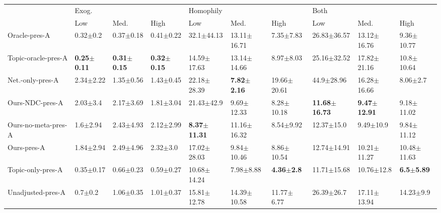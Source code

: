 \begin{tabular}{llllllllll}
\toprule
{} & \multicolumn{3}{l}{Exog.} & \multicolumn{3}{l}{Homophily} & \multicolumn{3}{l}{Both} \\
{} &                     Low &                    Med. &                    High &                      Low &                    Med. &                   High &                       Low &                     Med. &                   High \\
\midrule
Oracle-pres-A       &            0.32$\pm$0.2 &           0.37$\pm$0.18 &           0.41$\pm$0.22 &           32.1$\pm$44.13 &         13.11$\pm$16.71 &          7.35$\pm$7.83 &           26.83$\pm$36.57 &          13.12$\pm$16.76 &         9.36$\pm$10.77 \\
Topic-oracle-pres-A &  \textbf{0.25$\pm$0.11} &  \textbf{0.31$\pm$0.15} &  \textbf{0.32$\pm$0.15} &          14.59$\pm$17.63 &         13.14$\pm$14.66 &          8.97$\pm$8.03 &           25.16$\pm$32.52 &          17.82$\pm$21.16 &         10.8$\pm$10.64 \\
Net.-only-pres-A    &           2.34$\pm$2.22 &           1.35$\pm$0.56 &           1.43$\pm$0.45 &          22.18$\pm$28.39 &  \textbf{7.82$\pm$2.16} &        19.66$\pm$20.61 &            44.9$\pm$28.96 &          16.28$\pm$16.66 &           8.06$\pm$2.7 \\
Ours-NDC-pres-A     &            2.03$\pm$3.4 &           2.17$\pm$3.69 &           1.81$\pm$3.04 &           21.43$\pm$42.9 &          9.69$\pm$12.33 &         8.28$\pm$10.18 &  \textbf{11.68$\pm$16.73} &  \textbf{9.47$\pm$12.91} &         9.18$\pm$11.02 \\
Ours-no-meta-pres-A &            1.6$\pm$2.94 &           2.43$\pm$4.93 &           2.12$\pm$2.99 &  \textbf{8.37$\pm$11.31} &         11.16$\pm$16.32 &          8.54$\pm$9.92 &            12.37$\pm$15.0 &            9.49$\pm$10.9 &         9.84$\pm$11.12 \\
Ours-pres-A         &           1.84$\pm$2.94 &           2.49$\pm$4.96 &            2.32$\pm$3.0 &          17.02$\pm$28.03 &          9.84$\pm$10.46 &         8.86$\pm$10.54 &           12.74$\pm$14.91 &          10.21$\pm$11.27 &        10.48$\pm$11.63 \\
Topic-only-pres-A   &           0.35$\pm$0.17 &           0.66$\pm$0.23 &           0.59$\pm$0.27 &          10.68$\pm$14.24 &           7.98$\pm$8.88 &  \textbf{4.36$\pm$2.8} &           11.71$\pm$15.68 &           10.76$\pm$12.8 &  \textbf{6.5$\pm$5.89} \\
Unadjusted-pres-A   &             0.7$\pm$0.2 &           1.06$\pm$0.35 &           1.01$\pm$0.37 &          15.81$\pm$12.78 &         14.39$\pm$10.58 &         11.77$\pm$6.77 &            26.39$\pm$26.7 &          17.11$\pm$13.94 &          14.23$\pm$9.9 \\
\bottomrule
\end{tabular}
